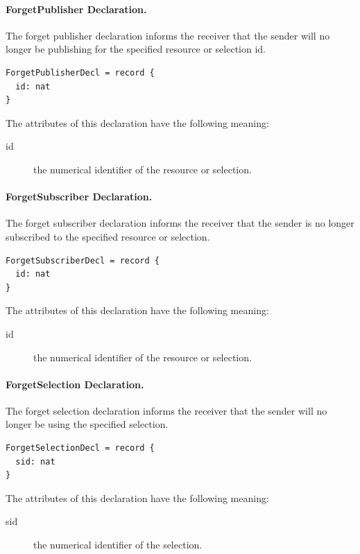 \documentclass[a4paper,oneside,article]{memoir}
\begin{document}
\paragraph{ForgetPublisher Declaration.} The forget publisher declaration informs the receiver that
the sender will no longer be publishing for the specified resource or selection id.
\begin{verbatim}
ForgetPublisherDecl = record {
  id: nat
}
\end{verbatim}
The attributes of this declaration have the following meaning:
\begin{description}
\item[id] the numerical identifier of the resource or selection.
\end{description}

\paragraph{ForgetSubscriber Declaration.} The forget subscriber declaration informs the receiver
that the sender is no longer subscribed to the specified resource or selection.
\begin{verbatim}
ForgetSubscriberDecl = record {
  id: nat
}
\end{verbatim}
The attributes of this declaration have the following meaning:
\begin{description}
\item[id] the numerical identifier of the resource or selection.
\end{description}

\paragraph{ForgetSelection Declaration.} The forget selection declaration informs the receiver that
the sender will no longer be using the specified selection.
\begin{verbatim}
ForgetSelectionDecl = record {
  sid: nat
}
\end{verbatim}
The attributes of this declaration have the following meaning:
\begin{description}
\item[sid] the numerical identifier of the selection.
\end{description}

\end{document}
